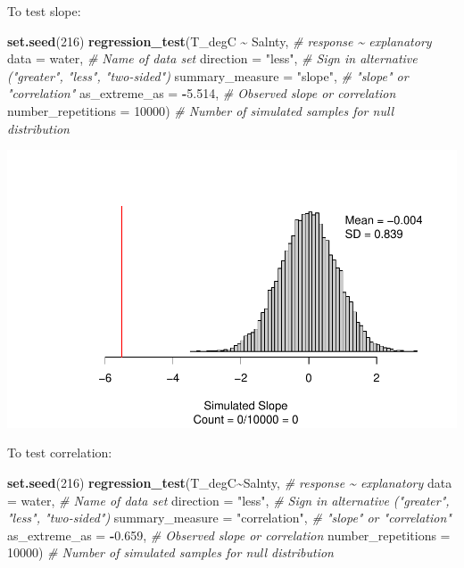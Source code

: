 \documentclass[
]{report}
\newenvironment{Shaded}{\begin{snugshade}}{\end{snugshade}}
\newcommand{\AttributeTok}[1]{\textcolor[rgb]{0.13,0.29,0.53}{#1}}
\newcommand{\CommentTok}[1]{\textcolor[rgb]{0.56,0.35,0.01}{\textit{#1}}}
\newcommand{\DecValTok}[1]{\textcolor[rgb]{0.00,0.00,0.81}{#1}}
\newcommand{\FloatTok}[1]{\textcolor[rgb]{0.00,0.00,0.81}{#1}}
\newcommand{\FunctionTok}[1]{\textcolor[rgb]{0.13,0.29,0.53}{\textbf{#1}}}
\newcommand{\NormalTok}[1]{#1}
\newcommand{\SpecialCharTok}[1]{\textcolor[rgb]{0.81,0.36,0.00}{\textbf{#1}}}
\newcommand{\StringTok}[1]{\textcolor[rgb]{0.31,0.60,0.02}{#1}}
\begin{document}
To test slope:

\begin{Shaded}
\begin{Highlighting}[]
\FunctionTok{set.seed}\NormalTok{(}\DecValTok{216}\NormalTok{)}
\FunctionTok{regression\_test}\NormalTok{(T\_degC }\SpecialCharTok{\textasciitilde{}}\NormalTok{ Salnty, }\CommentTok{\# response \textasciitilde{} explanatory}
               \AttributeTok{data =}\NormalTok{ water, }\CommentTok{\# Name of data set}
               \AttributeTok{direction =} \StringTok{"less"}\NormalTok{, }\CommentTok{\# Sign in alternative ("greater", "less", "two{-}sided")}
               \AttributeTok{summary\_measure =} \StringTok{"slope"}\NormalTok{, }\CommentTok{\# "slope" or "correlation"}
               \AttributeTok{as\_extreme\_as =} \SpecialCharTok{{-}}\FloatTok{5.514}\NormalTok{, }\CommentTok{\# Observed slope or correlation}
               \AttributeTok{number\_repetitions =} \DecValTok{10000}\NormalTok{) }\CommentTok{\# Number of simulated samples for null distribution}
\end{Highlighting}
\end{Shaded}

\begin{center}\includegraphics[width=0.7\linewidth]{13-VN13-regression_files/figure-latex/unnamed-chunk-13-1} \end{center}

\newpage

To test correlation:

\begin{Shaded}
\begin{Highlighting}[]
\FunctionTok{set.seed}\NormalTok{(}\DecValTok{216}\NormalTok{)}
\FunctionTok{regression\_test}\NormalTok{(T\_degC}\SpecialCharTok{\textasciitilde{}}\NormalTok{Salnty, }\CommentTok{\# response \textasciitilde{} explanatory}
               \AttributeTok{data =}\NormalTok{ water, }\CommentTok{\# Name of data set}
               \AttributeTok{direction =} \StringTok{"less"}\NormalTok{, }\CommentTok{\# Sign in alternative ("greater", "less", "two{-}sided")}
               \AttributeTok{summary\_measure =} \StringTok{"correlation"}\NormalTok{, }\CommentTok{\# "slope" or "correlation"}
               \AttributeTok{as\_extreme\_as =} \SpecialCharTok{{-}}\FloatTok{0.659}\NormalTok{, }\CommentTok{\# Observed slope or correlation}
               \AttributeTok{number\_repetitions =} \DecValTok{10000}\NormalTok{) }\CommentTok{\# Number of simulated samples for null distribution}
\end{Highlighting}
\end{Shaded}
\end{document}
